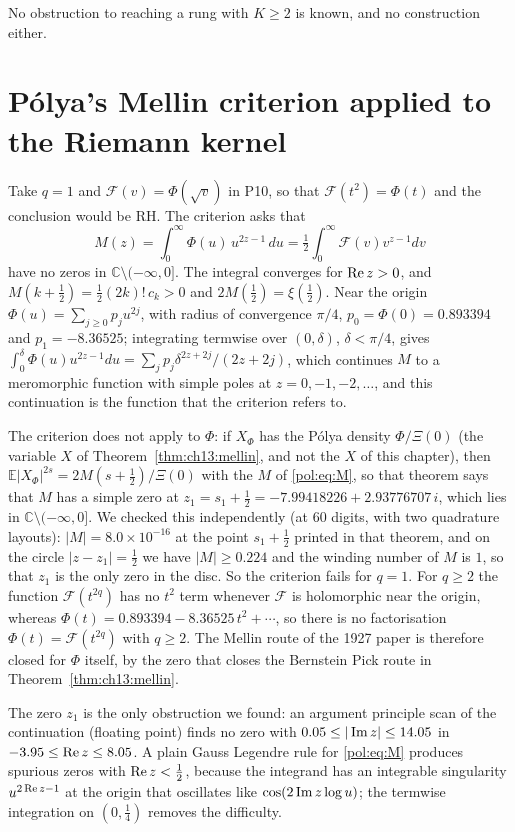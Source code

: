 No obstruction to reaching a rung with $K\ge2$ is known, and no construction either.

\section{P\'olya's Mellin criterion applied to the Riemann kernel}\label{pol:sec:mellin}

Take $q=1$ and $\mathcal F(v)=\Phi(\sqrt v)$ in P10, so that $\mathcal F(t^2)=\Phi(t)$ and the conclusion would be RH. The criterion asks that
\begin{equation}\label{pol:eq:M}
M(z)=\int_0^\infty\Phi(u)\,u^{2z-1}\,du=\tfrac12\int_0^\infty\mathcal F(v)v^{z-1}dv
\end{equation}
have no zeros in $\mathbb C\setminus(-\infty,0]$. The integral converges for $\operatorname{Re} z>0$, and $M(k+\frac12)=\frac12(2k)!\,c_k>0$ and $2M(\frac12)=\xi(\frac12)$. Near the origin $\Phi(u)=\sum_{j\ge0}p_ju^{2j}$, with radius of convergence $\pi/4$, $p_0=\Phi(0)=0.893394$ and $p_1=-8.36525$; integrating termwise over $(0,\delta)$, $\delta<\pi/4$, gives $\int_0^\delta\Phi(u)u^{2z-1}du=\sum_jp_j\delta^{2z+2j}/(2z+2j)$, which continues $M$ to a meromorphic function with simple poles at $z=0,-1,-2,\dots$, and this continuation is the function that the criterion refers to.

The criterion does not apply to $\Phi$: if $X_\Phi$ has the P\'olya density $\Phi/\Xi(0)$ (the variable $X$ of Theorem~\ref{thm:ch13:mellin}, and not the $X$ of this chapter), then $\mathbb E|X_\Phi|^{2s}=2M(s+\frac12)/\Xi(0)$ with the $M$ of \eqref{pol:eq:M}, so that theorem says that $M$ has a simple zero at $z_1=s_1+\frac12=-7.99418226+2.93776707\,i$, which lies in $\mathbb C\setminus(-\infty,0]$. We checked this independently (at 60 digits, with two quadrature layouts): $|M|=8.0\times10^{-16}$ at the point $s_1+\frac12$ printed in that theorem, and on the circle $|z-z_1|=\frac12$ we have $|M|\ge0.224$ and the winding number of $M$ is $1$, so that $z_1$ is the only zero in the disc. So the criterion fails for $q=1$. For $q\ge2$ the function $\mathcal F(t^{2q})$ has no $t^2$ term whenever $\mathcal F$ is holomorphic near the origin, whereas $\Phi(t)=0.893394-8.36525\,t^2+\cdots$, so there is no factorisation $\Phi(t)=\mathcal F(t^{2q})$ with $q\ge2$. The Mellin route of the 1927 paper is therefore closed for $\Phi$ itself, by the zero that closes the Bernstein Pick route in Theorem~\ref{thm:ch13:mellin}.

The zero $z_1$ is the only obstruction we found: an argument principle scan of the continuation (floating point) finds no zero with $0.05\le|\operatorname{Im} z|\le14.05$ in $-3.95\le\operatorname{Re} z\le8.05$. A plain Gauss Legendre rule for \eqref{pol:eq:M} produces spurious zeros with $\operatorname{Re} z<\frac12$, because the integrand has an integrable singularity $u^{2\operatorname{Re} z-1}$ at the origin that oscillates like $\cos(2\operatorname{Im} z\log u)$; the termwise integration on $(0,\frac14)$ removes the difficulty.
